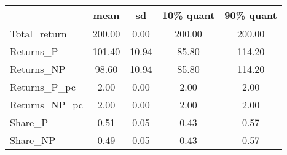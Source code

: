 \begin{tabular}{lcccc}
\toprule
{} &    mean &     sd &  10\% quant &  90\% quant \\
\midrule
Total\_return  &  200.00 &   0.00 &     200.00 &     200.00 \\
Returns\_P     &  101.40 &  10.94 &      85.80 &     114.20 \\
Returns\_NP    &   98.60 &  10.94 &      85.80 &     114.20 \\
Returns\_P\_pc  &    2.00 &   0.00 &       2.00 &       2.00 \\
Returns\_NP\_pc &    2.00 &   0.00 &       2.00 &       2.00 \\
Share\_P       &    0.51 &   0.05 &       0.43 &       0.57 \\
Share\_NP      &    0.49 &   0.05 &       0.43 &       0.57 \\
\bottomrule
\end{tabular}
